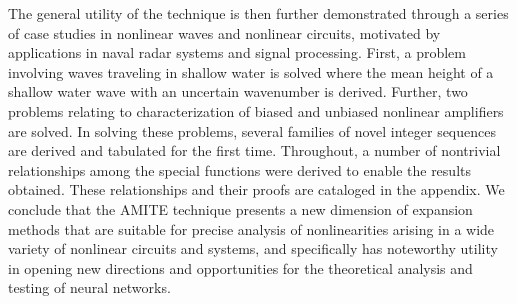 The general utility of the technique is then further demonstrated through a series of case studies in nonlinear waves and nonlinear circuits, motivated by applications in naval radar systems and signal processing. First, a problem involving waves traveling in shallow water is solved where the mean height of a shallow water wave with an uncertain wavenumber is derived. Further, two problems relating to characterization of biased and unbiased nonlinear amplifiers are solved.  In solving these problems, several families of novel integer sequences are derived and tabulated for the first time.  Throughout, a number of nontrivial relationships among the special functions were derived to enable the results obtained.  These relationships and their proofs are cataloged in the appendix.  We conclude that the AMITE technique presents a new dimension of expansion methods that are suitable for precise analysis of nonlinearities arising in a wide variety of nonlinear circuits and systems, and specifically has noteworthy utility in opening new directions and opportunities for the theoretical analysis and testing of neural networks.
